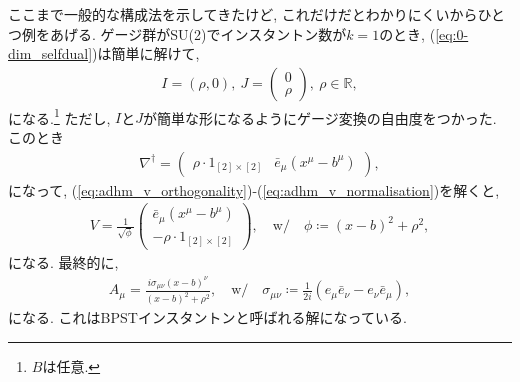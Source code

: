 \documentclass{ltjsarticle}
\theoremstyle{definition}
\begin{document}
ここまで一般的な構成法を示してきたけど, これだけだとわかりにくいからひとつ例をあげる. ゲージ群がSU(2)でインスタントン数が$k=1$のとき, (\ref{eq:0-dim_selfdual})は簡単に解けて,
\begin{gather}
  I=\left(\rho,0\right),\ J=
  \begin{pmatrix}
    0\\\rho
  \end{pmatrix},\ 
  \rho\in\mathbb R,
\end{gather}
になる.\footnote{$B$は任意.} ただし, $I$と$J$が簡単な形になるようにゲージ変換の自由度をつかった. このとき
\begin{gather}
  \nabla^\dagger=
  \begin{pmatrix}
    \rho\cdot1_{[2]\times[2]}&\bar e_\mu(x^\mu-b^\mu)
  \end{pmatrix},
\end{gather}
になって, (\ref{eq:adhm_v_orthogonality})-(\ref{eq:adhm_v_normalisation})を解くと,
\begin{gather}
  V=\frac1{\sqrt \phi}
  \begin{pmatrix}
    \bar e_\mu(x^\mu-b^\mu)\\
    -\rho\cdot1_{[2]\times[2]}
  \end{pmatrix},\quad
  \mathrm{w/}\quad\phi\coloneqq(x-b)^2+\rho^2,
\end{gather}
になる. 最終的に,
\begin{gather}
  A_\mu=\frac{i\sigma_{\mu\nu}(x-b)^\nu}{(x-b)^2+\rho^2},\quad\mathrm{w/}\quad\sigma_{\mu\nu}\coloneqq\frac1{2i}\left(e_\mu\bar e_\nu-e_\nu\bar e_\mu\right),
\end{gather}
になる. これはBPSTインスタントンと呼ばれる解になっている.
\end{document}
